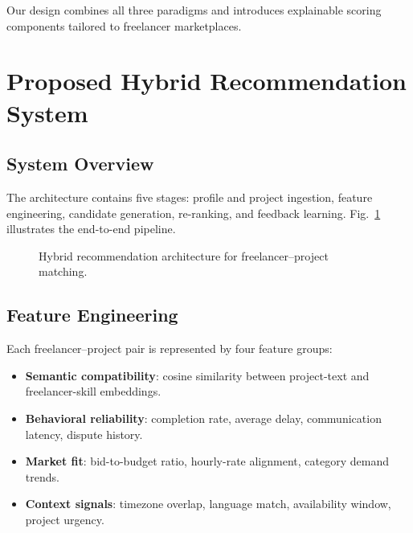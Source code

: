 \documentclass[conference]{IEEEtran}
\begin{document}
Our design combines all three paradigms and introduces explainable scoring components tailored to freelancer marketplaces.

\section{Proposed Hybrid Recommendation System}
\subsection{System Overview}
The architecture contains five stages: profile and project ingestion, feature engineering, candidate generation, re-ranking, and feedback learning. Fig.~\ref{fig:architecture} illustrates the end-to-end pipeline.

\begin{figure}[!t]
\centering
{}
\caption{Hybrid recommendation architecture for freelancer--project matching.}
\label{fig:architecture}
\end{figure}

\subsection{Feature Engineering}
Each freelancer--project pair is represented by four feature groups:
\begin{itemize}
\item \textbf{Semantic compatibility}: cosine similarity between project-text and freelancer-skill embeddings.
\item \textbf{Behavioral reliability}: completion rate, average delay, communication latency, dispute history.
\item \textbf{Market fit}: bid-to-budget ratio, hourly-rate alignment, category demand trends.
\item \textbf{Context signals}: timezone overlap, language match, availability window, project urgency.
\end{itemize}
\end{document}
